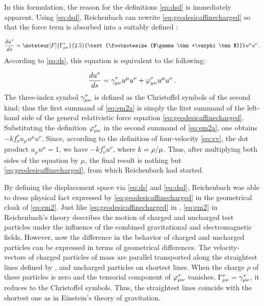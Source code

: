 \documentclass[submitted]{article}
\newcommand{\texts}[1]{\text{\footnotesize{#1}}}
\newcommand{\ctmrd}{\ensuremath{\hfrac{\rho}{\mu}}\xspace}
\begin{document}
In this formulation, the reason for the definitions \cref{eq:dsd} is immediately apparent. Using \cref{eq:dsd}, Reichenbach can rewrite \eqref{eq:geodesicaffinecharged} so that the force term is absorbed into a suitably defined \Gtmn:

\begin{equation}
\label{eq:em2} 
\frac{du^\tau}{ds} =\notateur[F]{\Gamma^{\tau}_{\mu\nu}}{2.5}{\texts{$\gamma\tmn+\varphi\tmn$}}u^\mu u^\nu\,.
\end{equation}
%
According to \cref{eq:ds}, this equation is equivalent to the following:

\begin{equation}
\label{eq:em2a} 
\frac{du^\tau}{ds}=\gamma^{\tau}_{\mu\nu}u^\mu u^\nu+\varphi^{\tau}_{\mu\nu}u^\mu u^\nu\,.
\end{equation}
%
The three-index symbol $\gamma^\tau_{\mu\nu}$ is defined as the Christoffel symbols of the second kind; thus the first summand of \cref{eq:em2a} is simply the first summand of the left-hand side of the general relativistic force equation \cref{eq:geodesicaffinecharged}. Substituting the definition $\varphi^\tau_{\mu\nu}$ in the second summand of \cref{eq:em2a}, one obtains $- k f_\nu^{\tau} u_\mu u^\mu u^\nu$. Since, according to the definition of four-velocity \cref{eq:vv}, the dot product $u_\mu u^\mu=1$, we have $- k f_\nu^{\tau} u^\nu$, where  $k=\ctmrd$. Thus, after multiplying both sides of the equation by $\mu$, the final result is nothing but \cref{eq:geodesicaffinecharged}, from which Reichenbach had started.

By defining the displacement space \Gtmn via \cref{eq:ds} and \cref{eq:dsd}, Reichenbach was able to dress physical fact expressed by \cref{eq:geodesicaffinecharged} in the geometrical cloak of \cref{eq:em2}. Just like \cref{eq:geodesicaffinecharged} in \gr, \cref{eq:em2} in Reichenbach's theory describes the motion of charged and uncharged test particles under the influence of the combined gravitational and electromagnetic fields. However, now the difference in the behavior of charged and uncharged particles can be expressed in terms of geometrical differences. The velocity-vectors of charged particles of mass are parallel transported along the straightest lines defined by \Gtmn, and uncharged particles on shortest lines. When the charge $\rho$ of these particles is zero and the tensorial component of $\varphi^\tau_{\mu\nu}$ vanishes, $\Gamma^\tau_{\mu\nu}=\gamma^\tau_{\mu\nu}$, \ie it reduces to the Christoffel symbols. Thus, the straightest lines coincide with the shortest one as in Einstein's theory of gravitation.
\end{document}
